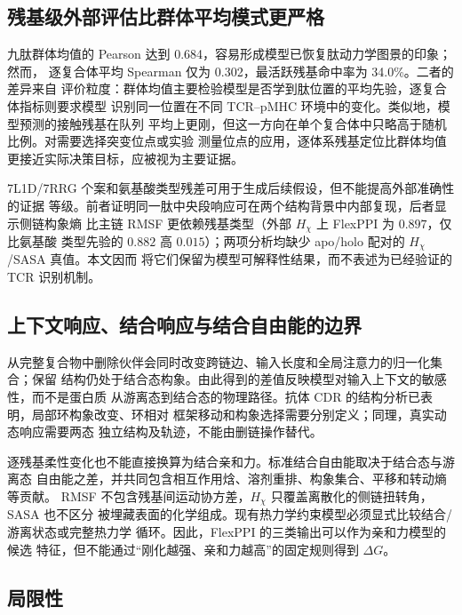 \subsection{残基级外部评估比群体平均模式更严格}

九肽群体均值的 Pearson 达到 0.684，容易形成模型已恢复肽动力学图景的印象；然而，
逐复合体平均 Spearman 仅为 0.302，最活跃残基命中率为 34.0\%。二者的差异来自
评价粒度：群体均值主要检验模型是否学到肽位置的平均先验，逐复合体指标则要求模型
识别同一位置在不同 TCR--pMHC 环境中的变化。类似地，模型预测的接触残基在队列
平均上更刚，但这一方向在单个复合体中只略高于随机比例。对需要选择突变位点或实验
测量位点的应用，逐体系残基定位比群体均值更接近实际决策目标，应被视为主要证据。

7L1D/7RRG 个案和氨基酸类型残差可用于生成后续假设，但不能提高外部准确性的证据
等级。前者证明同一肽中央段响应可在两个结构背景中内部复现，后者显示侧链构象熵
比主链 RMSF 更依赖残基类型（外部 $H_\chi$ 上 FlexPPI 为 $0.897$，仅比氨基酸
类型先验的 $0.882$ 高 $0.015$）；两项分析均缺少 apo/holo 配对的
$H_\chi$/SASA 真值。本文因而
将它们保留为模型可解释性结果，而不表述为已经验证的 TCR 识别机制。

\subsection{上下文响应、结合响应与结合自由能的边界}

从完整复合物中删除伙伴会同时改变跨链边、输入长度和全局注意力的归一化集合；保留
结构仍处于结合态构象。由此得到的差值反映模型对输入上下文的敏感性，而不是蛋白质
从游离态到结合态的物理路径。抗体 CDR 的结构分析已表明，局部环构象改变、环相对
框架移动和构象选择需要分别定义\cite{liu2024cdr}；同理，真实动态响应需要两态
独立结构及轨迹，不能由删链操作替代。

逐残基柔性变化也不能直接换算为结合亲和力。标准结合自由能取决于结合态与游离态
自由能之差，并共同包含相互作用焓、溶剂重排、构象集合、平移和转动熵等贡献。
RMSF 不包含残基间运动协方差，$H_\chi$ 只覆盖离散化的侧链扭转角，SASA 也不区分
被埋藏表面的化学组成。现有热力学约束模型必须显式比较结合/游离状态或完整热力学
循环\cite{jiao2024boltzmann}。因此，FlexPPI 的三类输出可以作为亲和力模型的候选
特征，但不能通过“刚化越强、亲和力越高”的固定规则得到 $\Delta G$。

\subsection{局限性}

